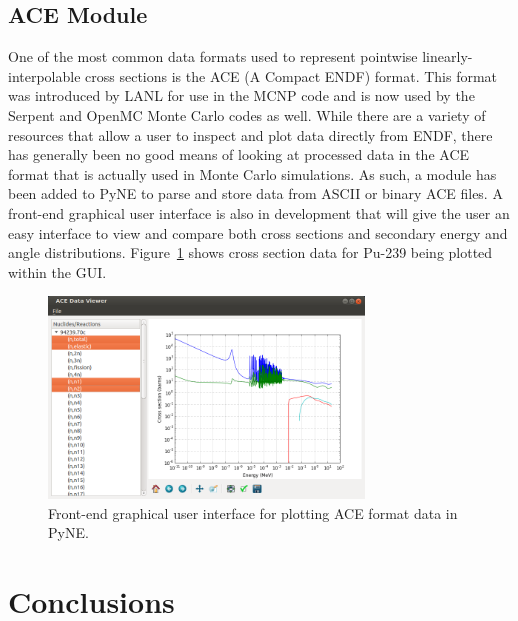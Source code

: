\documentclass{anstrans}
\begin{document}
\subsection{ACE Module}

One of the most common data formats used to represent pointwise
linearly-interpolable cross sections is the ACE (A Compact ENDF) format. This
format was introduced by LANL for use in the MCNP \cite{mcnp} code and is now
used by the Serpent \cite{serpent} and OpenMC \cite{openmc} Monte Carlo codes as
well. While there are a variety of resources that allow a user to inspect and
plot data directly from ENDF, there has generally been no good means of looking
at processed data in the ACE format that is actually used in Monte Carlo
simulations. As such, a module has been added to PyNE to parse and store data
from ASCII or binary ACE files. A front-end graphical user interface is also in
development that will give the user an easy interface to view and compare both
cross sections and secondary energy and angle
distributions. Figure~\ref{fig:ace-gui} shows cross section data for Pu-239
being plotted within the GUI.
\begin{figure}[ht]
  \centering
  \includegraphics[width=3.3in]{ace-gui.png}
  \caption{Front-end graphical user interface for plotting ACE format data in
    PyNE.}
  \label{fig:ace-gui}
\end{figure}

\section{Conclusions}

\nocite{*}


\end{document}

